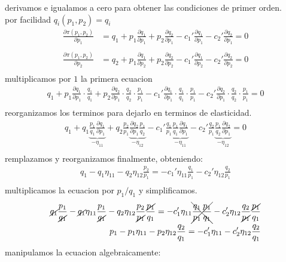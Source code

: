 \documentclass[11pt]{article}
\begin{document}
\begin{flushleft}
    derivamos e igualamos a cero para obtener las condiciones de primer orden.\\
    por facilidad $q_i(p_1,p_2) = q_i$
    \begin{align*}
        \frac{\partial \pi(p_1,p_2)}{\partial p_1} &= q_1 + p_1\frac{\partial q_1}{\partial p_1}+p_2\frac{\partial q_2}{\partial p_1} - c_1'\frac{\partial q_1}{\partial p_1} - c_2'\frac{\partial q_2}{\partial p_1} = 0\\
        ~\\
        \frac{\partial \pi(p_1,p_2)}{\partial p_2} &= q_2 + p_1\frac{\partial q_1}{\partial p_2}+p_2\frac{\partial q_2}{\partial p_2} - c_1'\frac{\partial q_1}{\partial p_2} - c_2'\frac{\partial q_2}{\partial p_2} = 0\\
    \end{align*}
    multiplicamos por $1$ la primera ecuacion
    \begin{align*}
        q_1 + p_1\frac{\partial q_1}{\partial p_1} \cdot \frac{q_1}{q_1} + p_2\frac{\partial q_2}{\partial p_1} \cdot \frac{q_2}{q_2} \cdot \frac{p_1}{p_1} - c_1'\frac{\partial q_1}{\partial p_1} \cdot \frac{q_1}{q_1} \cdot \frac{p_1}{p_1} - c_2'\frac{\partial q_2}{\partial p_1} \cdot \frac{q_2}{q_2} \cdot \frac{p_1}{p_1} = 0\\
    \end{align*}
    reorganizamos los terminos para dejarlo en terminos de elasticidad.
    \begin{align*}
        q_1 + q_1 \underbrace{\frac{p_1}{q_1} \frac{\partial q_1}{\partial p_1}}_{-\eta_{11}} + q_2 \frac{p_2}{p_1} \underbrace{\frac{\partial q_2}{\partial p_1} \frac{p_1}{q_2}}_{-\eta_{12}} - c_1' \frac{q_1}{p_1} \underbrace{\frac{p_1}{q_1} \frac{\partial q_1}{\partial p_1}}_{-\eta_{11}} - c_2' \frac{q_2}{p_1} \underbrace{\frac{p_1}{q_2} \frac{\partial q_2}{\partial p_1}}_{-\eta_{12}} = 0\\
    \end{align*}
    remplazamos y reorganizamos finalmente, obteniendo:
    \begin{align*}
        q_1 - q_1 \eta_{11} -  q_2 \eta_{12} \frac{p_2}{p_1} = - c_1' \eta_{11} \frac{q_1}{p_1} - c_2' \eta_{12} \frac{q_2}{p_1}\\
    \end{align*}
    multiplicamos la ecuacion por $p_1/q_1$ y simplificamos.
    \begin{align*}
        \cancel{q_1} \frac{p_1}{\cancel{q_1}}- \cancel{q_1} \eta_{11} \frac{p_1}{\cancel{q_1}}-  q_2 \eta_{12} \frac{p_2}{\cancel{p_1}} \frac{\cancel{p_1}}{q_1}= - c_1' \eta_{11} \xcancel{\frac{q_1}{p_1} \frac{p_1}{q_1}}- c_2' \eta_{12} \frac{q_2}{\cancel{p_1}} \frac{\cancel{p_1}}{q_1}\\
        p_1 - p_1 \eta_{11} -  p_2 \eta_{12} \frac{q_2}{q_1} = - c_1' \eta_{11} - c_2' \eta_{12} \frac{q_2}{q_1}\\
    \end{align*}
    manipulamos la ecuacion algebraicamente:
\end{flushleft}
\end{document}
